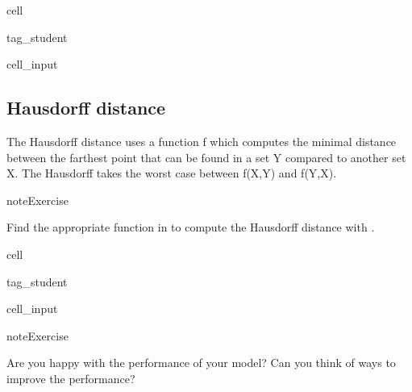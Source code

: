 \documentclass[letterpaper,10pt,english]{jupyterBook}
\begin{document}
\begin{sphinxuseclass}{cell}
\begin{sphinxuseclass}{tag_student}\begin{sphinxVerbatimInput}

\begin{sphinxuseclass}{cell_input}
\begin{sphinxVerbatim}[commandchars=\\\{\}]
\end{sphinxVerbatim}

\end{sphinxuseclass}\end{sphinxVerbatimInput}

\end{sphinxuseclass}
\end{sphinxuseclass}

\subsection{Hausdorff distance}
\label{\detokenize{notebooks/Tutorial3_Segmentation/Tutorial3_Segmentation_student:hausdorff-distance}}
\sphinxAtStartPar
The Hausdorff distance uses a function f which computes the minimal distance between the farthest point that can be found in a set Y compared to another set X. The Hausdorff takes the worst case between f(X,Y) and f(Y,X).



\begin{sphinxadmonition}{note}{Exercise}

\sphinxAtStartPar
Find the appropriate function in  to compute the Hausdorff distance with .
\end{sphinxadmonition}

\begin{sphinxuseclass}{cell}
\begin{sphinxuseclass}{tag_student}\begin{sphinxVerbatimInput}

\begin{sphinxuseclass}{cell_input}
\begin{sphinxVerbatim}[commandchars=\\\{\}]
\end{sphinxVerbatim}

\end{sphinxuseclass}\end{sphinxVerbatimInput}

\end{sphinxuseclass}
\end{sphinxuseclass}
\begin{sphinxadmonition}{note}{Exercise}

\sphinxAtStartPar
Are you happy with the performance of your model? Can you think of ways to improve the performance?
\end{sphinxadmonition}
\end{document}
